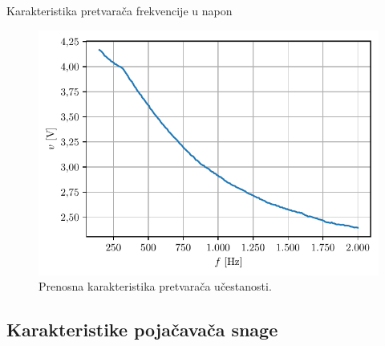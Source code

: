 \documentclass[aspectratio=169,xcolor=dvipsnames]{beamer}
\begin{document}

\begin{frame}{Karakteristika pretvarača frekvencije u napon}
    \begin{figure}
    \includegraphics[width=0.6\linewidth]{fig/FVkka.pdf}
    \caption{Prenosna karakteristika pretvarača učestanosti.}
    \end{figure}
\end{frame}


\subsection{Karakteristike pojačavača snage}
\end{document}
